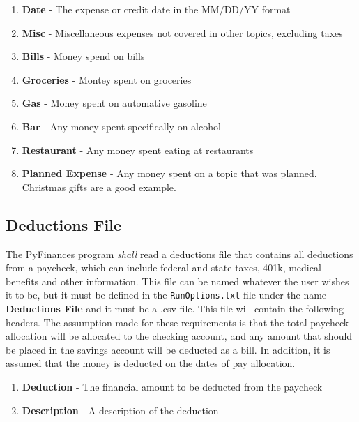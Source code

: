 {\begin{enumerate}
    \item {\textbf{Date}} - The expense or credit date in the MM/DD/YY format
    \item {\textbf{Misc}} - Miscellaneous expenses not covered in other topics, 
	                    excluding taxes
    \item {\textbf{Bills}} - Money spend on bills
    \item {\textbf{Groceries}} - Montey spent on groceries
    \item {\textbf{Gas}} - Money spent on automative gasoline
    \item {\textbf{Bar}} - Any money spent specifically on alcohol
    \item {\textbf{Restaurant}} - Any money spent eating at restaurants
    \item {\textbf{Planned Expense}} - Any money spent on a topic that was planned.
	                               Christmas gifts are a good example.
\end{enumerate}

\subsection{Deductions File}
The PyFinances program {\textit{shall}} read a deductions file that contains 
all deductions from a paycheck, which can include federal and state taxes, 
401k, medical benefits and other information.
This file can be named whatever the user wishes it to be, but it must be defined
in the {\texttt{RunOptions.txt}} file under the name {\textbf{Deductions File}} and 
it must be a .csv file.  This file will contain the following headers.  The 
assumption made for these requirements is that the total paycheck allocation
will be allocated to the checking account, and any amount that should be 
placed in the savings account will be deducted as a bill.  In addition, it
is assumed that the money is deducted on the dates of pay allocation.

\begin{enumerate}
    \item {\textbf{Deduction}} - The financial amount to be deducted from the
	                         paycheck
    \item {\textbf{Description}} - A description of the deduction
\end{enumerate}

}
